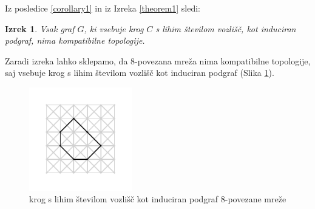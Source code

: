 \documentclass[a4paper, 12pt]{book}
\newtheorem{theorem}{Izrek}[section]
\theoremstyle{definition}
\begin{document}
Iz posledice \ref*{corollary1} in iz Izreka \ref*{theorem1} sledi:
\begin{theorem}
Vsak graf $G$, ki vsebuje krog $C$ s lihim številom vozlišč, kot induciran podgraf,
nima kompatibilne topologije.
\end{theorem}
Zaradi izreka lahko sklepamo, da 8-povezana mreža nima kompatibilne topologije,
saj vsebuje krog s lihim številom vozlišč kot induciran podgraf (Slika \ref{oddCircle}).
\begin{figure}
  \begin{center}
  \includegraphics[width=0.4\textwidth]{odd_circle.pdf}
  \end{center}
  \caption{krog s lihim številom vozlišč kot induciran podgraf 8-povezane mreže}
  \label{oddCircle}
\end{figure}

\nocite{*}
\cleardoublepage
{}


\end{document}
